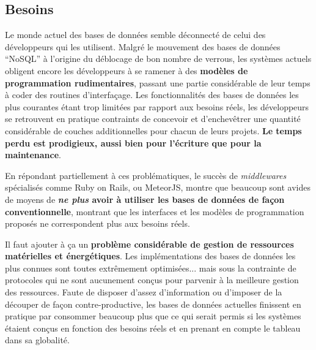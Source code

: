 \documentclass[a4paper,10pt]{scrreprt}
\begin{document}
        \subsection{Besoins}
        
            Le monde actuel des bases de données semble déconnecté de celui des dévelop\-peurs qui les utilisent. Malgré le mouvement des bases de données ``NoSQL'' à l'origine du déblocage de bon nombre de verrous, les systèmes actuels obligent encore les développeurs à se ramener à des \textbf{modèles de programmation rudimentaires}, passant une partie considérable de leur temps à coder des routines d'interfaçage. Les fonctionnalités des bases de données les plus courantes étant trop limitées par rapport aux besoins réels, les développeurs se retrouvent en pratique contraints de concevoir et d'enchevêtrer une quantité considérable de couches additionnelles pour chacun de leurs projets. \textbf{Le temps perdu est prodigieux, aussi bien pour l'écriture que pour la maintenance}.
            
            
            En répondant partiellement à ces problématiques, le succès de \textit{middlewares} spécialisés comme Ruby on Rails, ou MeteorJS, montre que beaucoup sont avides de moyens de \textbf{\textit{ne plus} avoir à utiliser les bases de données de façon conventionnelle}, montrant que les interfaces et les modèles de programmation proposés ne correspondent plus aux besoins réels.
            

            \medskip
            Il faut ajouter à ça un \textbf{problème considérable de gestion de ressources matérielles et énergétiques}. Les implémentations des bases de données les plus connues sont toutes extrêmement optimisées... mais sous la contrainte de protocoles qui ne sont aucunement conçus pour parvenir à la meilleure gestion des ressources. Faute de disposer d'assez d'information ou d'imposer de la découper de façon contre-productive, les bases de données actuelles finissent en pratique par consommer beaucoup plus que ce qui serait permis si les systèmes étaient conçus en fonction des besoins réels et en prenant en compte le tableau dans sa globalité.
            
\end{document}
